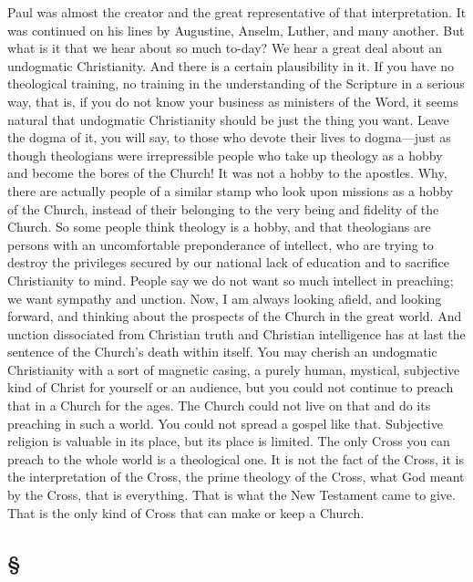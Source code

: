 \documentclass[draft]{ptfdoc}
\begin{document}
Paul was almost the creator and the great 
representative of that interpretation. It was 
continued on his lines by Augustine, Anselm, 
Luther, and many another. But what is it 
that we hear about so much to-day? We 
hear a great deal about an undogmatic Christianity. 
And there is a certain plausibility in 
it. If you have no theological training, no 
training in the understanding of the Scripture 
in a serious way, that is, if you do not know 
your business as ministers of the Word, it seems 
natural that undogmatic Christianity should be 
just the thing you want. Leave the dogma 
of it, you will say, to those who devote their 
lives to dogma---just as though theologians were 
irrepressible people who take up theology as a 
hobby and become the bores of the Church! 
It was not a hobby to the apostles. Why, 
there are actually people of a similar stamp 
who look upon missions as a hobby of the 
Church, instead of their belonging to the 
very being and fidelity of the Church. So 
some people think theology is a hobby, and 
that theologians are persons with an uncomfortable 
preponderance of intellect, who are 
trying to destroy the privileges secured by 
our national lack of education and to sacrifice 
Christianity to mind. People say we do not 
want so much intellect in preaching; we want 
sympathy and unction. Now, I am always looking 
afield, and looking forward, and thinking 
about the prospects of the Church in the great 
world. And unction dissociated from Christian 
truth and Christian intelligence has at last the 
sentence of the Church's death within itself. 
You may cherish an undogmatic Christianity 
with a sort of magnetic casing, a purely human, 
mystical, subjective kind of Christ for yourself 
or an audience, but you could not continue to 
preach that in a Church for the ages. The 
Church could not live on that and do its 
preaching in such a world. You could not 
spread a gospel like that. Subjective religion 
is valuable in its place, but its place is limited. 
The only Cross you can preach to the whole 
world is a theological one. It is not the fact 
of the Cross, it is the interpretation of the 
Cross, the prime theology of the Cross, what 
God meant by the Cross, that is everything. 
That is what the New Testament came to 
give. That is the only kind of Cross that 
can make or keep a Church.

\subsection*{
\S
} 
\end{document}

